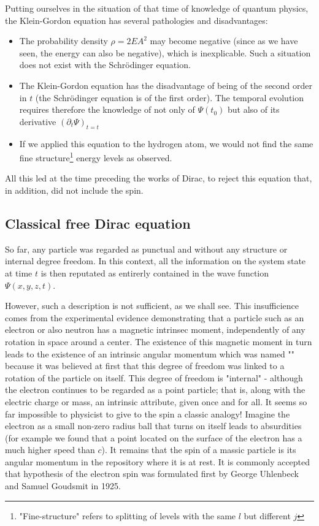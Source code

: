 	Putting ourselves in the situation of that time of knowledge of quantum physics, the Klein-Gordon equation has several pathologies and disadvantages:
	\begin{itemize}
		\item The probability density $\rho=2EA^2$ may become negative (since as we have seen, the energy can also be negative), which is inexplicable. Such a situation does not exist with the Schrödinger equation.
		
		\item The Klein-Gordon equation has the disadvantage of being of the second order in $t$ (the Schrödinger equation is of the first order). The temporal evolution requires therefore the knowledge of not only of $\Psi(t_0)$ but also of its derivative $(\partial_t \Psi)_{t=t}$

		\item If we applied this equation to the hydrogen atom, we would not find the same fine structure\footnote{"Fine-structure" refers to splitting of levels with the same $l$ but different $j$} energy levels as observed.		
	\end{itemize}
	All this led at the time preceding the works of Dirac, to reject this equation that, in addition, did not include the spin.

	\pagebreak	
	\subsection{Classical free Dirac equation}\label{classical free dirac equation}
	So far, any particle was regarded as punctual and without any structure or internal degree freedom. In this context, all the information on the system state at time $t$ is then reputated as entirerly contained in the wave function $\Psi(x,y,z,t)$.

	However, such a description is not sufficient, as we shall see. This insufficience comes from the experimental evidence demonstrating that a particle such as an electron or also neutron has a magnetic intrinsec moment, independently of any rotation in space around a center. The existence of this magnetic moment in turn leads to the existence of an intrinsic angular momentum which was named "" because it was believed at first that this degree of freedom was linked to a rotation of the particle on itself. This degree of freedom is "internal" - although the electron continues to be regarded as a point particle; that is, along with the electric charge or mass, an intrinsic attribute, given once and for all. It seems so far impossible to physicist to give to the spin a classic analogy! Imagine the electron as a small non-zero radius ball that turns on itself leads to absurdities (for example we found that a point located on the surface of the electron has a much higher speed than $c$). It remains that the spin of a massic particle is its angular momentum in the repository where it is at rest. It is commonly accepted that hypothesis of the electron spin was formulated first by George Uhlenbeck and Samuel Goudsmit in 1925.

